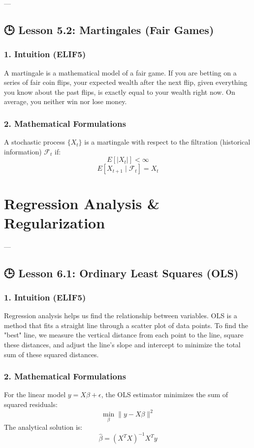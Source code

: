 \documentclass[11pt,oneside]{book}
\begin{document}
---

\section{🕒 Lesson 5.2: Martingales (Fair Games)}

\subsection{1. Intuition (ELIF5)}
A martingale is a mathematical model of a fair game. If you are betting on a series of fair coin flips, your expected wealth after the next flip, given everything you know about the past flips, is exactly equal to your wealth right now. On average, you neither win nor lose money.

\subsection{2. Mathematical Formulations}
A stochastic process $\{X_t\}$ is a martingale with respect to the filtration (historical information) $\mathcal{F}_t$ if:
$$E[|X_t|] < \infty$$
$$E[X_{t+1} \mid \mathcal{F}_t] = X_t$$


\newpage

\chapter{Regression Analysis & Regularization}

---

\section{🕒 Lesson 6.1: Ordinary Least Squares (OLS)}

\subsection{1. Intuition (ELIF5)}
Regression analysis helps us find the relationship between variables. OLS is a method that fits a straight line through a scatter plot of data points. To find the "best" line, we measure the vertical distance from each point to the line, square these distances, and adjust the line's slope and intercept to minimize the total sum of these squared distances.

\subsection{2. Mathematical Formulations}
For the linear model $y = X\beta + \epsilon$, the OLS estimator minimizes the sum of squared residuals:
$$\min_{\beta} \|y - X\beta\|^2$$
The analytical solution is:
$$\hat{\beta} = (X^T X)^{-1} X^T y$$
\end{document}
